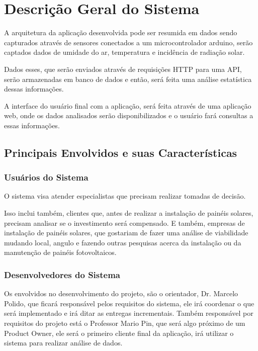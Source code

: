 \chapter{Descrição Geral do Sistema}

A arquitetura da aplicação desenvolvida pode ser resumida em dados sendo capturados através de sensores conectados a um microcontrolador arduino, serão captados dados de umidade do ar, temperatura e incidência de radiação solar.

Dados esses, que serão enviados através de requisições HTTP para uma API, serão armazenadas em banco de dados e então, será feita uma análise estatística dessas informações.

A interface do usuário final com a aplicação, será feita através de uma aplicação web, onde os dados analisados serão disponibilizados e o usuário fará consultas a essas informações.

\section{Principais Envolvidos e suas Características}

\subsection{Usuários do Sistema}

O sistema visa atender especialistas que precisam realizar tomadas de decisão.

Isso inclui também, clientes que, antes de realizar a instalação de painéis solares, precisam analisar se o investimento será compensado. E também, empresas de instalação de painéis solares, que gostariam de fazer uma análise de viabilidade mudando local, angulo e fazendo outras pesquisas acerca da instalação ou da manutenção de painéis fotovoltaicos.

\subsection{Desenvolvedores do Sistema}

Os envolvidos no desenvolvimento do projeto, são o orientador, Dr. Marcelo Polido, que ficará responsável pelos requisitos do sistema, ele irá coordenar o que será implementado e irá ditar as entregas incrementais. Também responsável por requisitos do projeto está o Professor Mario Pin, que será algo próximo de um Product Owner, ele será o primeiro cliente final da aplicação, irá utilizar o sistema para realizar análise de dados.

